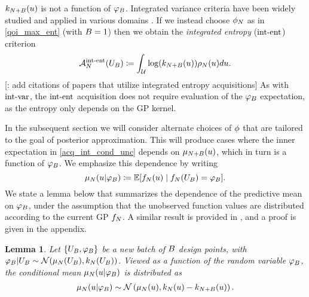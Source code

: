 \documentclass[12pt]{article}
\newtheorem{lemma}{Lemma}
\begin{document}
$\gpKer[\Naugment](\Par)$ is not a function of $\funcVal[\Nbatch]$. Integrated variance criteria have 
been widely studied and applied in various domains 
\citep{Mercer_kernels_IVAR, Binois_2018, gramacy2020surrogates, parallelSURExcursionSet}. 
If we instead  choose $\qoi$ as in \ref{qoi_max_ent} (with $\Nbatch=1$) then we obtain the 
\textit{integrated entropy} ($\intentLabel$) criterion
\begin{equation}
\labelAcq[\Ndesign]{\intentLabel}(\designBatchIn)
\Def \int_{\parSpace} \log(\gpKer[\Naugment](\Par)) \weightDens(\Par) d\Par. \label{acq_int_ent}
\end{equation}
[\todo: add citations of papers that utilize integrated entropy acquisitions]
As with $\intvarLabel$, the $\intentLabel$ acquisition does not require evaluation of the $\funcVal[\Nbatch]$ 
expectation, as the entropy only depends on the GP kernel. 

In the subsequent section we will consider alternate 
choices of $\qoiMap$ that are tailored to the goal of posterior approximation. This will produce cases where the 
inner expectation in \ref{acq_int_cond_unc} depends on $\gpMean[\Naugment](\Par)$, which in turn is a function 
of $\funcVal[\Nbatch]$. We emphasize this dependence by writing
\begin{equation}
\gpMean[\Ndesign](\Par | \designBatchFunc) 
\Def \E[\funcEm[\Ndesign](\Par) \given \funcEm[\Ndesign](\designBatchIn) = \designBatchFunc].
\label{conditional-mean-notation}
\end{equation}
We state a lemma below that summarizes the dependence of the predictive 
mean on $\funcVal[\Nbatch]$, under the assumption that the unobserved function values are distributed 
according to the current GP $\funcEm[\Ndesign]$. A similar result is provided in \cite{VehtariParallelGP}, 
and a proof is given in the appendix.
 \begin{lemma} \label{lemma:pred-mean-dist}
Let $\{\designBatchIn, \funcVal[\Nbatch]\}$ be a new batch of $\Nbatch$ design points, with
$\designBatchFunc | \designBatchIn \sim \Gaussian(\gpMean[\Ndesign](\designBatchIn), \gpKer[\Ndesign](\designBatchIn))$. 
Viewed as a function of the random variable 
$\designBatchFunc$, the conditional mean $\gpMean[\Ndesign](\Par| \designBatchFunc)$ is 
distributed as 
\begin{align}
\gpMean[\Ndesign](\Par | \designBatchFunc)
\sim \Gaussian\left(\gpMean[\Ndesign](\Par), 
                               \gpKer[\Ndesign](\Par) - \gpKer[\Naugment](\Par) \right) \label{pred-mean-dist}.
\end{align}
\end{lemma}
\end{document}
